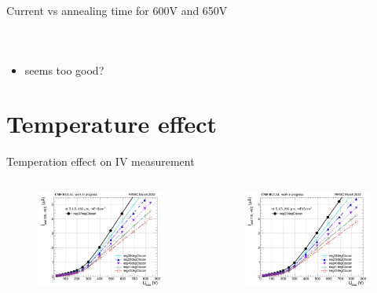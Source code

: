\documentclass{beamer}
\begin{document}
\begin{frame}{Current vs annealing time for 600V and 650V}
\begin{columns}
\begin{figure}
       \end{figure}
   \end{columns}
   \begin{itemize}
    \item seems too good?
   \end{itemize}
\end{frame}


\section{Temperature effect}

\begin{frame}{Temperation effect on IV measurement}
    \begin{columns}
        \begin{figure}
            \includegraphics[width=1.0\textwidth]{plots/8in_198ch_2019_N4790_21_4E15_tempareture_effect_100.png}
        \end{figure}
        \begin{figure}
            \includegraphics[width=1.0\textwidth]{plots/8in_198ch_2019_N4790_21_4E15_tempareture_effect_110.png}

\end{figure}
\end{columns}
\end{frame}
\end{document}
